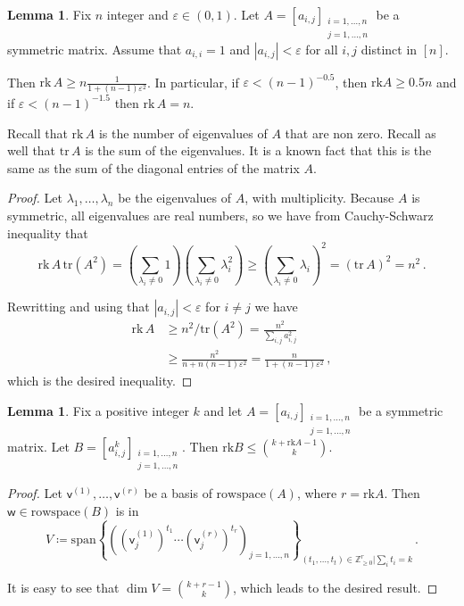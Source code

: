 \documentclass[12pt]{amsart}
\theoremstyle{definition}
\newtheorem{lm}[thm]{Lemma}
\newcommand{\Z}{\mathbb{Z}}
\newcommand{\vv}{\mathsf{v}}
\newcommand{\vw}{\mathsf{w}}
\newcommand{\spn}{\mathrm{span}}
\newcommand{\rk}{\mathrm{rk}}
\newcommand{\tr}{\mathrm{tr}}
\begin{document}
\begin{lm}\label{lm:JL_1}
Fix $n$ integer and $\varepsilon \in (0, 1)$.
Let $A = [a_{i, j}]_{\substack{i = 1, \ldots , n \\ j = 1, \ldots , n}}$ be a symmetric matrix.
Assume that $a_{i, i} = 1$ and $|a_{i, j}| < \varepsilon $ for all $i, j$ distinct in $[n]$.

Then $\rk \,A \geq n \frac{1}{1 + (n-1)\varepsilon^2}$.
In particular, if $\varepsilon < (n-1)^{-0.5}$, then $\rk A \geq 0.5 n$ and if $\varepsilon < (n-1)^{-1.5}$ then $\rk \,A = n$.
\end{lm}

Recall that $\rk \, A$ is the number of eigenvalues of $A$ that are non zero.
Recall as well that $\tr \, A$ is the sum of the eigenvalues.
It is a known fact that this is the same as the sum of the diagonal entries of the matrix $A$.

\begin{proof}
Let $\lambda_1, \ldots, \lambda_n$ be the eigenvalues of $A$, with multiplicity.
Because $A$ is symmetric, all eigenvalues are real numbers, so we have from Cauchy-Schwarz inequality that
$$\rk \, A \,  \tr (A^2)= \left(\sum_{\lambda_i \neq 0} 1 \right)\left( \sum_{\lambda_i \neq 0} \lambda_i^2\right) \geq \left( \sum_{\lambda_i \neq 0} \lambda_i \right)^2 = (\tr\,  A)^2 = n^2 \, . $$

Rewritting and using that $|a_{i, j}| < \varepsilon$ for $i\neq j$ we have 
\begin{align*}
\rk \, A &\geq n^2/\tr (A^2) = \frac{n^2}{\sum_{i, j} a_{i, j}^2} \\
&\geq \frac{n^2}{n + n(n-1)\varepsilon^2} = \frac{n}{1 + (n-1)\varepsilon^2}\, ,
\end{align*}
which is the desired inequality.
\end{proof}

\begin{lm}\label{lm:JL_2}
Fix a positive integer $k$ and let $A = [a_{i, j}]_{\substack{i = 1, \ldots , n \\ j = 1, \ldots , n}}$ be a symmetric matrix.
Let $B = [a_{i, j}^k]_{\substack{i = 1, \ldots , n \\ j = 1, \ldots , n}}$.
Then $\rk B \leq \binom{k + \rk A - 1}{k}$.
\end{lm}

\begin{proof}
Let $\vv^{(1)}, \ldots, \vv^{(r)} $ be a basis of $\mathrm{rowspace}(A)$, where $r = \rk A$.
Then $\vw \in \mathrm{rowspace}(B)$ is in 
$$V \coloneqq \spn \left\{ \left((\vv_j^{(1)})^{t_1} \cdots (\vv_j^{(r)})^{t_r} \right)_{j = 1, \ldots, n}\right\}_{(t_1, \ldots , t_t) \in \Z_{\geq 0}^r | \sum_i t_i = k } \, .$$

It is easy to see that $\dim V = \binom{k + r - 1}{k}$, which leads to the desired result.
\end{proof}
\end{document}
